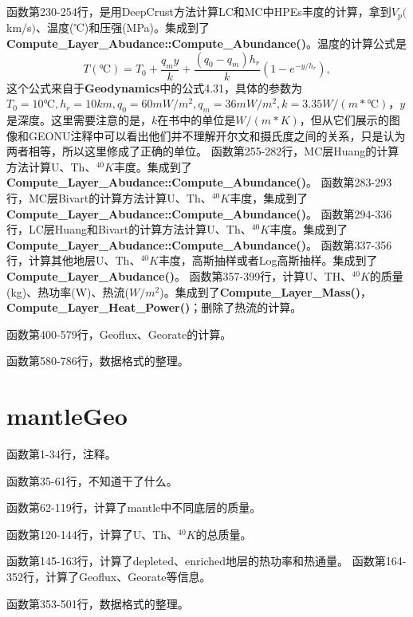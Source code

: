 		\begin{GCBox}[title = DeepCrust和丰度的计算方法]{}
			函数第230-254行，是用DeepCrust方法计算LC和MC中HPEs丰度的计算，拿到$V_p($km/s$)$、温度(℃)和压强(MPa)。集成到了\textbf{Compute\_Layer\_Abudance::Compute\_Abundance()}。温度的计算公式是
				\begin{equation}
					T(℃)
					= T_0 + \frac{q_my}{k} + \frac{(q_0 - q_m)h_r}{k}\left(1 - e^{-y/h_r}\right),
				\end{equation}
			这个公式来自于\textbf{Geodynamics}中的公式4.31，具体的参数为$T_0 = 10℃, h_r = 10 km, q_0 = 60 mW/m^2, q_m = 36 mW/m^2, k = 3.35 W/(m*℃)$，$y$是深度。{\color{red}这里需要注意的是，$k$在书中的单位是$W/(m*K)$，但从它们展示的图像和GEONU注释中可以看出他们并不理解开尔文和摄氏度之间的关系，只是认为两者相等，所以这里修成了正确的单位。}
		\tcbline
			函数第255-282行，MC层Huang的计算方法计算U、Th、${}^{40}K$丰度。集成到了\textbf{Compute\_Layer\_Abudance::Compute\_Abundance()}。
		\tcbline
			函数第283-293行，MC层Bivart的计算方法计算U、Th、${}^{40}K$丰度，集成到了\textbf{Compute\_Layer\_Abudance::Compute\_Abundance()}。
		\tcbline
			函数第294-336行，LC层Huang和Bivart的计算方法计算U、Th、${}^{40}K$丰度。集成到了\textbf{Compute\_Layer\_Abudance::Compute\_Abundance()}。
		\tcbline
			函数第337-356行，计算其他地层U、Th、${}^{40}K$丰度，高斯抽样或者Log高斯抽样。集成到了\textbf{Compute\_Layer\_Abudance()}。
		\tcbline
			函数第357-399行，计算U、TH、${}^{40}K$的质量(kg)、热功率(W)、热流($W/m^2$)。集成到了\textbf{Compute\_Layer\_Mass()}，\textbf{Compute\_Layer\_Heat\_Power()}；删除了热流的计算。
		\end{GCBox}
		\begin{GCBox}[title = 其他]{}
			函数第400-579行，Geoflux、Georate的计算。\par
			函数第580-786行，数据格式的整理。
		\end{GCBox}
	\section{mantleGeo}
		\begin{GCBox}[title = 丰度计算]{}
			函数第1-34行，注释。\par
			函数第35-61行，不知道干了什么。\par
			函数第62-119行，计算了mantle中不同底层的质量。\par
			函数第120-144行，计算了U、Th、${}^{40}K$的总质量。\par
			函数第145-163行，计算了depleted、enriched地层的热功率和热通量。
			函数第164-352行，计算了Geoflux、Georate等信息。\par
			函数第353-501行，数据格式的整理。
		\end{GCBox}
